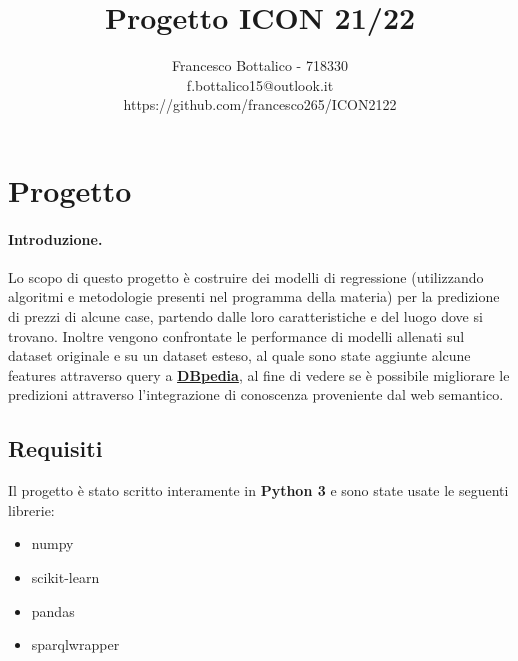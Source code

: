 \documentclass{article}
\title{Progetto ICON 21/22}
\author{Francesco Bottalico - 718330 \\
		f.bottalico15@outlook.it \\
		https://github.com/francesco265/ICON2122}
\date{}
\begin{document}
\maketitle
\tableofcontents

\section{Progetto}
\paragraph{Introduzione.}
Lo scopo di questo progetto è costruire dei modelli di regressione (utilizzando
algoritmi e metodologie presenti nel programma della materia) per la
predizione di prezzi di alcune case, partendo dalle loro caratteristiche e
del luogo dove si trovano. Inoltre vengono confrontate le performance di modelli
allenati sul dataset originale e su un dataset esteso, al quale sono state
aggiunte alcune features attraverso query a \href{http://dbpedia.org}
{\textbf{DBpedia}}, al fine di vedere se è possibile migliorare le predizioni 
attraverso l'integrazione di conoscenza proveniente dal web semantico.

\subsection{Requisiti}
Il progetto è stato scritto interamente in \textbf{Python 3} e sono state usate
le seguenti librerie:
\begin{itemize}
	\itemsep0em
	\item numpy
	\item scikit-learn
	\item pandas
	\item sparqlwrapper
\end{itemize}
\end{document}
